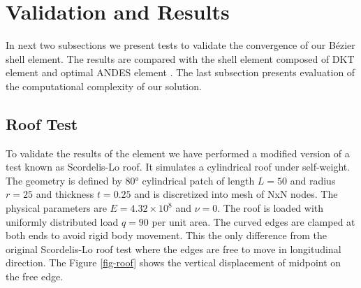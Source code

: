 \documentclass{egpubl}
\begin{document}
%


\section{Validation and Results} %


In next two subsections we present tests to validate the convergence of our
Bézier shell element. The results are compared with the shell element
composed of DKT element and optimal ANDES element \cite{Felippa2003}. The
last subsection presents evaluation of the computational complexity of our
solution.

\subsection{Roof Test}

To validate the results of the element we have performed a modified version
of a test known as Scordelis-Lo roof. It simulates a cylindrical roof under
self-weight. The geometry is defined by 80° cylindrical patch of length
$L=50$ and radius $r=25$ and thickness $t=0.25$ and is discretized into
mesh of NxN nodes. The physical parameters are $E = 4.32 \times 10^8$ and
$\nu = 0$. The roof is loaded with uniformly distributed load $q = 90$ per
unit area. The curved edges are clamped at both ends to avoid rigid body
movement. This the only difference from the original Scordelis-Lo roof test
where the edges are free to move in longitudinal direction. The Figure
\ref{fig-roof} shows the vertical displacement of midpoint on the free
edge.
\end{document}
